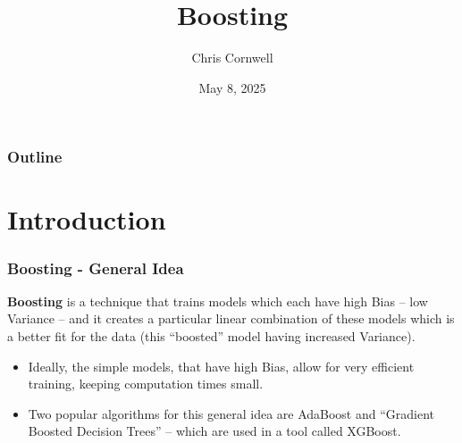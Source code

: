 \documentclass[smaller]{beamer}
\author{Chris Cornwell}
\date{May 8, 2025}
\title{Boosting}
\theoremstyle{example}
\begin{document}
\begin{frame}
\titlepage
\end{frame}

\begin{frame}
    \frametitle{Outline}
    \tableofcontents
\end{frame}

\section{Introduction}

\begin{frame}
    \frametitle{Boosting - General Idea}

    \textbf{Boosting} is a technique that trains models which each have high Bias {--} low Variance {--} and it creates a particular linear combination of these models which is a better fit for the data (this ``boosted'' model having increased Variance).

    \vspace{12pt}

    \begin{itemize}
        \item Ideally, the simple models, that have high Bias, allow for very efficient training, keeping computation times small.
        \item Two popular algorithms for this general idea are AdaBoost and ``Gradient Boosted Decision Trees'' {--} which are used in a tool called XGBoost.
    \end{itemize}
    
\end{frame}
\end{document}
